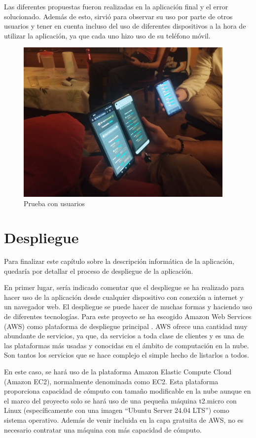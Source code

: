 Las diferentes propuestas fueron realizadas en la aplicación final y el error solucionado. Además de esto, sirvió para observar su uso por parte de otros usuarios
y tener en cuenta incluso del uso de diferentes dispositivos a la hora de utilizar la aplicación, ya que cada uno hizo uso de su teléfono móvil.

\begin{figure}[ht!]
	\centering
	\includegraphics[height=8cm,clip=true]{res_prueba.jpg}
	\caption{Prueba con usuarios}
	\label{fig:res_prueba}
\end{figure}




\section{Despliegue}

Para finalizar este capítulo sobre la descripción informática de la aplicación, quedaría por detallar el proceso de despliegue de la 
aplicación.

En primer lugar, sería indicado comentar que el despliegue se ha realizado para hacer uso de la aplicación desde cualquier dispositivo
con conexión a internet y un navegador web. El despliegue se puede hacer de muchas formas y haciendo uso de diferentes tecnologías. Para 
este proyecto se ha escogido Amazon Web Services (AWS) como plataforma de despliegue principal \cite{aws}. AWS ofrece una cantidad muy abundante
de servicios, ya que, da servicios a toda clase de clientes y es una de las plataformas más usadas y conocidas en el ámbito de 
computación en la nube. Son tantos los servicios que se hace complejo el simple hecho de listarlos a todos.

En este caso, se hará uso de la plataforma Amazon Elastic Compute Cloud (Amazon EC2), normalmente denominada como EC2. Esta plataforma
proporciona capacidad de cómputo con tamaño modificable en la nube aunque en el marco del proyecto solo se hará uso de una pequeña máquina
t2.micro con Linux (específicamente con una imagen ``Ubuntu Server 24.04 LTS'') como sistema operativo. Además de venir incluida en la capa gratuita de AWS, no es necesario contratar 
una máquina con más capacidad de cómputo. 

